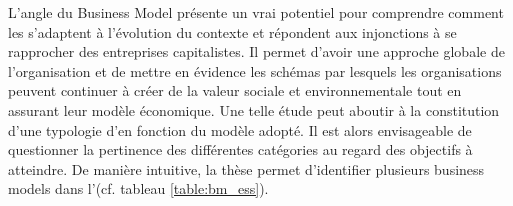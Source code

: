            L'angle du Business Model présente un vrai potentiel pour comprendre comment les \oess s'adaptent à l'évolution du contexte et répondent aux injonctions à se rapprocher des entreprises capitalistes. Il permet d'avoir une approche globale de l'organisation et de mettre en évidence les schémas par lesquels les organisations peuvent continuer à créer de la valeur sociale et environnementale tout en assurant leur modèle économique. Une telle étude peut aboutir à la constitution d'une typologie d'\oess en fonction du modèle adopté. Il est alors envisageable de questionner la pertinence des différentes catégories au regard des objectifs à atteindre. De manière intuitive, la thèse permet d'identifier plusieurs business models dans l'\ess (cf. tableau \ref{table:bm_ess}). \\


